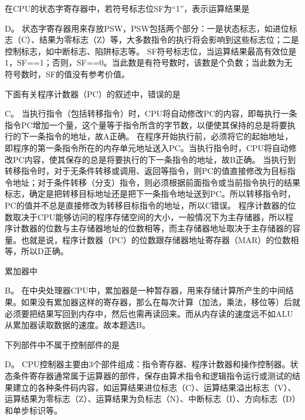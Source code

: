 \question 在CPU的状态字寄存器中，若符号标志位SF为``1''，表示运算结果是
\par{}
\begin{solution}D。
状态字寄存器用来存放PSW，PSW包括两个部分：一是状态标志，如进位标志（C）、结果为零标志（Z）等，大多数指令的执行将会影响到这些标志位；二是控制标志，如中断标志、陷阱标志等。
SF符号标志位，当运算结果最高有效位是1，SF==1；否则，SF==0。当此数是有符号数时，该数是个负数；当此数为无符号数时，SF的值没有参考价值。
\end{solution}
\question 下面有关程序计数器（PC）的叙述中，错误的是
\par{}
\begin{solution}C。
当执行指令（包括转移指令）时，CPU将自动修改PC的内容，即每执行一条指令PC增加一个量，这个量等于指令所含的字节数，以便使其保持的总是将要执行的下一条指令的地址，故A正确。
在程序开始执行前，必须将它的起始地址，即程序的第一条指令所在的内存单元地址送入PC。当执行指令时，CPU将自动修改PC内容，使其保存的总是将要执行的下一条指令的地址，故B正确。
当执行到转移指令时，对于无条件转移或调用、返回等指令，则PC的值直接修改为目标指令地址；对于条件转移（分支）指令，则必须根据前面指令或当前指令执行的结果标志，确定是把转移目标地址还是把下一条指令地址送到PC。所以转移指令时，PC的值并不总是直接修改为转移目标指令的地址，所以C错误。
程序计数器的位数取决于CPU能够访问的程序存储空间的大小，一般情况下为主存储器，所以程序计数器的位数与主存储器地址的位数相等，而主存储器地址取决于主存储器的容量。也就是说，程序计数器（PC）的位数跟存储器地址寄存器（MAR）的位数相等，所以D正确。
\end{solution}
\question 累加器中
\par{}
\begin{solution}B。
在中央处理器CPU中，累加器是一种暂存器，用来存储计算所产生的中间结果。如果没有累加器这样的寄存器，那么在每次计算（加法，乘法，移位等）后就必须要把结果写回到内存中，然后也需再读回来。而从内存读的速度远不如ALU从累加器读取数据的速度。故本题选B。
\end{solution}
\question 下列部件中不属于控制部件的是
\par{}
\begin{solution}D。
CPU控制器主要由3个部件组成：指令寄存器、程序计数器和操作控制器。状态条件寄存器通常属于运算器的部件，保存由算术指令和逻辑指令运行或测试的结果建立的各种条件码内容，如运算结果进位标志（C）、运算结果溢出标志（V）、运算结果为零标志（Z）、运算结果为负标志（N）、中断标志（I）、方向标志（D）和单步标识等。
\end{solution}
